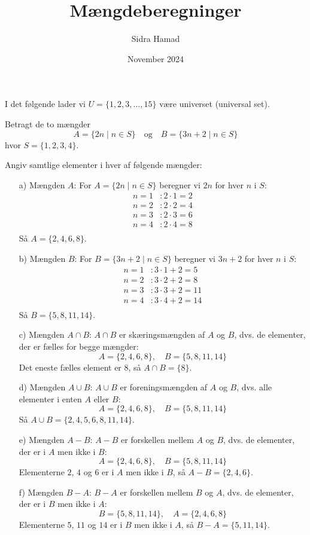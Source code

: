 \documentclass{article}
\title{Mængdeberegninger}
\author{Sidra Hamad}
\date{November 2024}
\begin{document}
\maketitle

I det følgende lader vi $U = \{1, 2, 3, \dots, 15\}$ være universet (universal set).

Betragt de to mængder
\[
A = \{2n \mid n \in S\} \quad \text{og} \quad B = \{3n + 2 \mid n \in S\}
\]
hvor $S = \{1, 2, 3, 4\}$.

Angiv samtlige elementer i hver af følgende mængder:

\begin{itemize}
    \item[a)] Mængden $A$: For $A = \{2n \mid n \in S\}$ beregner vi $2n$ for hver $n$ i $S$:
    \begin{align*}
        n = 1 &: 2 \cdot 1 = 2 \\
        n = 2 &: 2 \cdot 2 = 4 \\
        n = 3 &: 2 \cdot 3 = 6 \\
        n = 4 &: 2 \cdot 4 = 8 \\
    \end{align*}
    Så $A = \{2, 4, 6, 8\}$.
    
    \item[b)] Mængden $B$: For $B = \{3n + 2 \mid n \in S\}$ beregner vi $3n + 2$ for hver $n$ i $S$:
    \begin{align*}
        n = 1 &: 3 \cdot 1 + 2 = 5 \\
        n = 2 &: 3 \cdot 2 + 2 = 8 \\
        n = 3 &: 3 \cdot 3 + 2 = 11 \\
        n = 4 &: 3 \cdot 4 + 2 = 14 \\
    \end{align*}
    Så $B = \{5, 8, 11, 14\}$.
    
    \item[c)] Mængden $A \cap B$: $A \cap B$ er skæringsmængden af $A$ og $B$, dvs. de elementer, der er fælles for begge mængder:
    \[
    A = \{2, 4, 6, 8\}, \quad B = \{5, 8, 11, 14\}
    \]
    Det eneste fælles element er $8$, så $A \cap B = \{8\}$.
    
    \item[d)] Mængden $A \cup B$: $A \cup B$ er foreningsmængden af $A$ og $B$, dvs. alle elementer i enten $A$ eller $B$:
    \[
    A = \{2, 4, 6, 8\}, \quad B = \{5, 8, 11, 14\}
    \]
    Så $A \cup B = \{2, 4, 5, 6, 8, 11, 14\}$.
    
    \item[e)] Mængden $A - B$: $A - B$ er forskellen mellem $A$ og $B$, dvs. de elementer, der er i $A$ men ikke i $B$:
    \[
    A = \{2, 4, 6, 8\}, \quad B = \{5, 8, 11, 14\}
    \]
    Elementerne $2$, $4$ og $6$ er i $A$ men ikke i $B$, så $A - B = \{2, 4, 6\}$.
    
    \item[f)] Mængden $B - A$: $B - A$ er forskellen mellem $B$ og $A$, dvs. de elementer, der er i $B$ men ikke i $A$:
    \[
    B = \{5, 8, 11, 14\}, \quad A = \{2, 4, 6, 8\}
    \]
    Elementerne $5$, $11$ og $14$ er i $B$ men ikke i $A$, så $B - A = \{5, 11, 14\}$.
\end{itemize}
\end{document}
